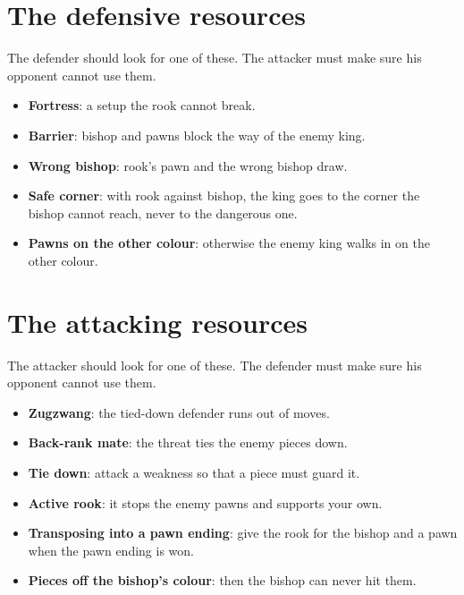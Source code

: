 
\section*{The defensive resources}
The defender should look for one of these. The attacker must make sure his opponent cannot use them.

\begin{itemize}
\item \textbf{Fortress}: a setup the rook cannot break.

\item \textbf{Barrier}: bishop and pawns block the way of the enemy king.

\item \textbf{Wrong bishop}: rook's pawn and the wrong bishop draw.

\item \textbf{Safe corner}: with rook against bishop, the king goes to the corner the bishop cannot reach, never to the dangerous one.

\item \textbf{Pawns on the other colour}: otherwise the enemy king walks in on the other colour.
\end{itemize}

\section*{The attacking resources}
The attacker should look for one of these. The defender must make sure his opponent cannot use them.

\begin{itemize}
\item \textbf{Zugzwang}: the tied-down defender runs out of moves.

\item \textbf{Back-rank mate}: the threat ties the enemy pieces down.

\item \textbf{Tie down}: attack a weakness so that a piece must guard it.

\item \textbf{Active rook}: it stops the enemy pawns and supports your own.

\item \textbf{Transposing into a pawn ending}: give the rook for the bishop and a pawn when the pawn ending is won.

\item \textbf{Pieces off the bishop's colour}: then the bishop can never hit them.
\end{itemize}

